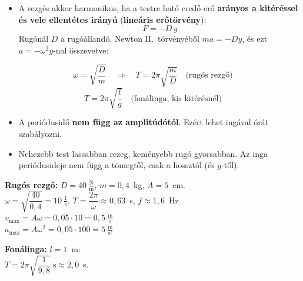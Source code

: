 \documentclass[12pt]{article}
\begin{document}
\begin{minipage}[t]{0.56\linewidth}\vspace{0pt}
\begin{itemize}
  \item A rezgés akkor harmonikus, ha a testre ható eredő erő \textbf{arányos a kitéréssel
    és vele ellentétes irányú} (\textbf{lineáris erőtörvény}):
    \[ F = -D\,y \]
    Rugónál $D$ a rugóállandó. Newton II.\ törvényéből $ma = -Dy$, és ezt $a = -\omega^2y$-nal
    összevetve:
\end{itemize}
\begin{fontos}
\[ \omega = \sqrt{\frac{D}{m}} \quad\Longrightarrow\quad
   \boxed{T = 2\pi\sqrt{\frac{m}{D}}} \quad\text{(rugós rezgő)} \]
\[ \boxed{T = 2\pi\sqrt{\frac{l}{g}}} \quad\text{(fonálinga, kis kitérésnél)} \]
\end{fontos}
\begin{itemize}
  \item A periódusidő \textbf{nem függ az amplitúdótól}. Ezért lehet ingával órát
    szabályozni.
  \item Nehezebb test lassabban rezeg, keményebb rugó gyorsabban. Az inga periódusideje nem
    függ a tömegtől, csak a hossztól (és $g$-től).
\end{itemize}
\end{minipage}\hfill
\begin{minipage}[t]{0.41\linewidth}\vspace{0pt}
\begin{pelda}
\textbf{Rugós rezgő:} $D = 40~\tfrac{\text{N}}{\text{m}}$, $m = 0{,}4$~kg, $A = 5$~cm.\\[3pt]
$\omega = \sqrt{\dfrac{40}{0{,}4}} = 10~\tfrac1{\text{s}}$, \quad
$T = \dfrac{2\pi}{\omega} \approx 0{,}63$~s, \quad $f \approx 1{,}6$~Hz\\[3pt]
$v_\text{max} = A\omega = 0{,}05\cdot 10 = 0{,}5~\tfrac{\text{m}}{\text{s}}$\\[2pt]
$a_\text{max} = A\omega^2 = 0{,}05\cdot 100 = 5~\tfrac{\text{m}}{\text{s}^2}$

\medskip
\textbf{Fonálinga:} $l = 1$~m:\\[2pt]
$T = 2\pi\sqrt{\dfrac{1}{9{,}8}}~\text{s} \approx 2{,}0$~s.
\end{pelda}

\centering
{}
\end{minipage}
\end{document}
